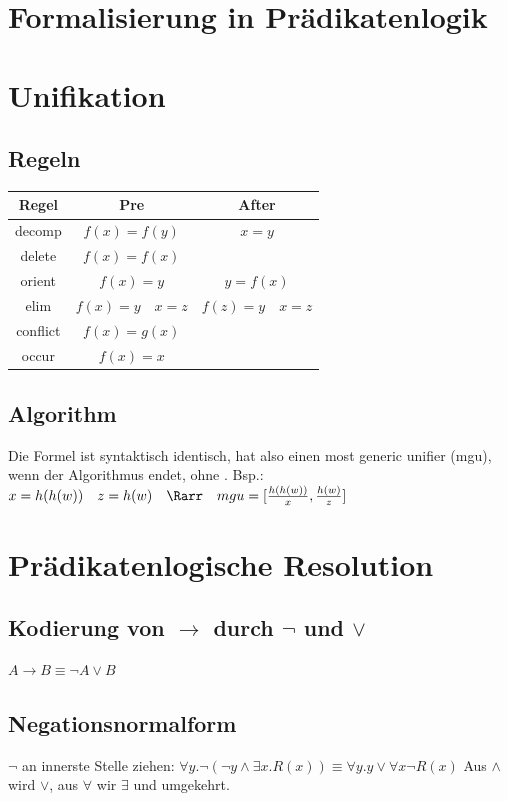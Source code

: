\documentclass[a4paper]{article}
\begin{document}
	\section{Formalisierung in Prädikatenlogik}
	\section{Unifikation}
		\subsection{Regeln} %
			\begin{center}
				\begin{tabular} {c|c|c}
					Regel & Pre & After \\
					\hline
					decomp & $f(x)=f(y)$ & $x=y$ \\
					\hline
					delete & $f(x) = f(x)$ & \\
					\hline
					orient & $f(x) = y$ & $y = f(x)$ \\
					\hline
					elim & $f(x) = y \quad x = z$ & $f(z)= y \quad x = z$ \\
					\hline
					conflict & $f(x) = g(x)$ & \bot \\
					\hline
					occur & $f(x) = x $ & \bot
				\end{tabular}
			\end{center}
		\subsection{Algorithm}
			Die Formel ist syntaktisch identisch, hat also einen most generic unifier (mgu), wenn der Algorithmus endet, ohne \bot. \newline
			Bsp.: $x=h(h(w)) \quad z = h(w) \quad \Rarr \quad mgu = [\frac{h(h(w))}{x}, \frac{h(w)}{z}]$
	\section{Prädikatenlogische Resolution}
		\subsection{Kodierung von $\to$ durch $\lnot$ und $\lor$}
			$A\to B \equiv \lnot A \lor B$
		\subsection{Negationsnormalform}
			$\lnot$ an innerste Stelle ziehen: \newline
			$\forall y.\lnot(\lnot y \land \exists x. R(x))\equiv \forall y.y \lor \forall x \lnot R(x)$ \newline
			Aus $\land$ wird $\lor$, aus $\forall$ wir $\exists$ und umgekehrt. 
\end{document}

